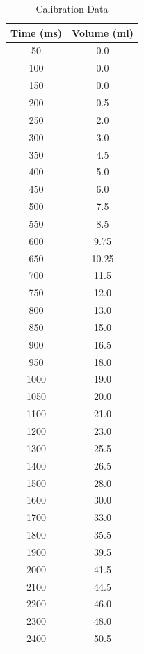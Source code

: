 \begin{table}[H]
    \centering
    \small
    \caption{Calibration Data}\label{tab:calibration}
    \begin{tabular}{|c|c|}
        \hline
        \textbf{Time (ms)} & \textbf{Volume (ml)} \\
        \hline
        50   & 0.0   \\
        100  & 0.0   \\
        150  & 0.0   \\
        200  & 0.5   \\
        250  & 2.0   \\
        300  & 3.0   \\
        350  & 4.5   \\
        400  & 5.0   \\
        450  & 6.0   \\
        500  & 7.5   \\
        550  & 8.5   \\
        600  & 9.75  \\
        650  & 10.25 \\
        700  & 11.5  \\
        750  & 12.0  \\
        800  & 13.0  \\
        850  & 15.0  \\
        900  & 16.5  \\
        950  & 18.0  \\
        1000 & 19.0  \\
        1050 & 20.0  \\
        1100 & 21.0  \\
        1200 & 23.0  \\
        1300 & 25.5  \\
        1400 & 26.5  \\
        1500 & 28.0  \\
        1600 & 30.0  \\
        1700 & 33.0  \\
        1800 & 35.5  \\
        1900 & 39.5  \\
        2000 & 41.5  \\
        2100 & 44.5  \\
        2200 & 46.0  \\
        2300 & 48.0  \\
        2400 & 50.5  \\
        \hline
    \end{tabular}
\end{table}
\newpage
